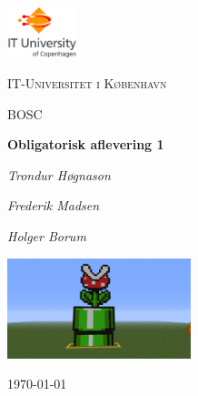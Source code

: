 
\begin{titlepage}
	\centering
	\includegraphics[width=0.15\textwidth]{logo}\par\vspace{1cm}
	{\scshape\LARGE IT-Universitet i København \par}
	\vspace{1cm}
	{\scshape\Large BOSC\par}
	\vspace{1.5cm}
	{\huge\bfseries Obligatorisk aflevering 1\par}
	\vspace{2cm}
	{\Large\itshape Trondur Høgnason\par}
	{\Large\itshape Frederik Madsen\par}
	{\Large\itshape Holger Borum\par}
	\vspace{1 cm}
	\includegraphics[width=0.4\textwidth]{pipe}\par\vspace{1cm}
	

	{\large \today\par}
\end{titlepage}